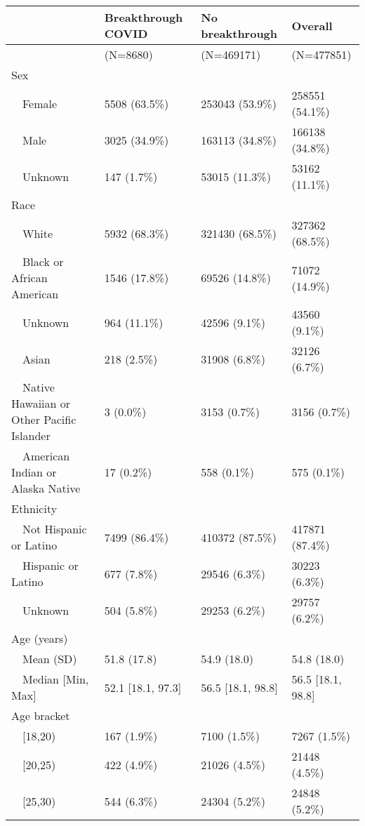 \begin{table}[ht]
\centering
\begin{tabular}{llll}
  \hline
  & Breakthrough COVID & No breakthrough & Overall \\ 
  \hline
 & (N=8680) & (N=469171) & (N=477851) \\ 
  Sex &  &  &  \\ 
    Female & 5508 (63.5\%) & 253043 (53.9\%) & 258551 (54.1\%) \\ 
    Male & 3025 (34.9\%) & 163113 (34.8\%) & 166138 (34.8\%) \\ 
    Unknown & 147 (1.7\%) & 53015 (11.3\%) & 53162 (11.1\%) \\ 
  Race &  &  &  \\ 
    White & 5932 (68.3\%) & 321430 (68.5\%) & 327362 (68.5\%) \\ 
    Black or African American & 1546 (17.8\%) & 69526 (14.8\%) & 71072 (14.9\%) \\ 
    Unknown & 964 (11.1\%) & 42596 (9.1\%) & 43560 (9.1\%) \\ 
    Asian & 218 (2.5\%) & 31908 (6.8\%) & 32126 (6.7\%) \\ 
    Native Hawaiian or Other Pacific Islander & 3 (0.0\%) & 3153 (0.7\%) & 3156 (0.7\%) \\ 
    American Indian or Alaska Native & 17 (0.2\%) & 558 (0.1\%) & 575 (0.1\%) \\ 
  Ethnicity &  &  &  \\ 
    Not Hispanic or Latino & 7499 (86.4\%) & 410372 (87.5\%) & 417871 (87.4\%) \\ 
    Hispanic or Latino & 677 (7.8\%) & 29546 (6.3\%) & 30223 (6.3\%) \\ 
    Unknown & 504 (5.8\%) & 29253 (6.2\%) & 29757 (6.2\%) \\ 
  Age (years) &  &  &  \\ 
    Mean (SD) & 51.8 (17.8) & 54.9 (18.0) & 54.8 (18.0) \\ 
    Median [Min, Max] & 52.1 [18.1, 97.3] & 56.5 [18.1, 98.8] & 56.5 [18.1, 98.8] \\ 
  Age bracket &  &  &  \\ 
    [18,20) & 167 (1.9\%) & 7100 (1.5\%) & 7267 (1.5\%) \\ 
    [20,25) & 422 (4.9\%) & 21026 (4.5\%) & 21448 (4.5\%) \\ 
    [25,30) & 544 (6.3\%) & 24304 (5.2\%) & 24848 (5.2\%) \\ 

\end{tabular}
\end{table}
